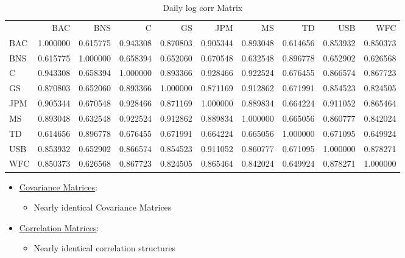 \documentclass{article}
\begin{document}
\begin{table}
\caption{Daily log corr Matrix}
\label{tab:daily_log_corr}
\begin{tabular}{lrrrrrrrrr}
 & BAC & BNS & C & GS & JPM & MS & TD & USB & WFC \\
BAC & 1.000000 & 0.615775 & 0.943308 & 0.870803 & 0.905344 & 0.893048 & 0.614656 & 0.853932 & 0.850373 \\
BNS & 0.615775 & 1.000000 & 0.658394 & 0.652060 & 0.670548 & 0.632548 & 0.896778 & 0.652902 & 0.626568 \\
C & 0.943308 & 0.658394 & 1.000000 & 0.893366 & 0.928466 & 0.922524 & 0.676455 & 0.866574 & 0.867723 \\
GS & 0.870803 & 0.652060 & 0.893366 & 1.000000 & 0.871169 & 0.912862 & 0.671991 & 0.854523 & 0.824505 \\
JPM & 0.905344 & 0.670548 & 0.928466 & 0.871169 & 1.000000 & 0.889834 & 0.664224 & 0.911052 & 0.865464 \\
MS & 0.893048 & 0.632548 & 0.922524 & 0.912862 & 0.889834 & 1.000000 & 0.665056 & 0.860777 & 0.842024 \\
TD & 0.614656 & 0.896778 & 0.676455 & 0.671991 & 0.664224 & 0.665056 & 1.000000 & 0.671095 & 0.649924 \\
USB & 0.853932 & 0.652902 & 0.866574 & 0.854523 & 0.911052 & 0.860777 & 0.671095 & 1.000000 & 0.878271 \\
WFC & 0.850373 & 0.626568 & 0.867723 & 0.824505 & 0.865464 & 0.842024 & 0.649924 & 0.878271 & 1.000000 \\
\end{tabular}
\end{table}

\begin{itemize}
    \item \underline{Covariance Matrices}:
    \begin{itemize}
        \item Nearly identical Covariance Matrices
    \end{itemize}
    \item \underline{Correlation Matrices}:
    \begin{itemize}
        \item Nearly identical correlation structures
    \end{itemize}
\end{itemize}
    
\end{document}
